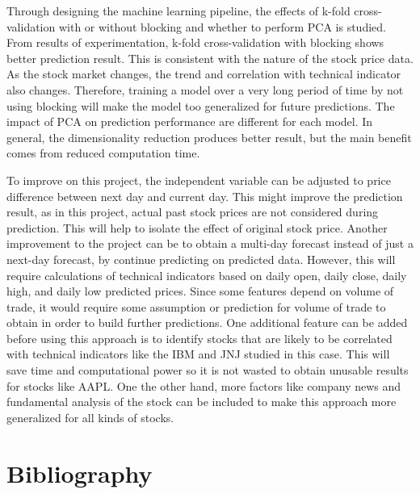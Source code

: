 \documentclass[conference]{IEEEtran}
\begin{document}
Through designing the machine learning pipeline, the effects of k-fold cross-validation with or without blocking and whether to perform PCA is studied. From results of experimentation, k-fold cross-validation with blocking shows better prediction result. This is consistent with the nature of the stock price data. As the stock market changes, the trend and correlation with technical indicator also changes. Therefore, training a model over a very long period of time by not using blocking will make the model too generalized for future predictions. The impact of PCA on prediction performance are different for each model. In general, the dimensionality reduction produces better result, but the main benefit comes from reduced computation time.

To improve on this project, the independent variable can be adjusted to price difference between next day and current day. This might improve the prediction result, as in this project, actual past stock prices are not considered during prediction. This will help to isolate the effect of original stock price. Another improvement to the project can be to obtain a multi-day forecast instead of just a next-day forecast, by continue predicting on predicted data. However, this will require calculations of technical indicators based on daily open, daily close, daily high, and daily low predicted prices. Since some features depend on volume of trade, it would require some assumption or prediction for volume of trade to obtain in order to build further predictions. One additional feature can be added before using this approach is to identify stocks that are likely to be correlated with technical indicators like the IBM and JNJ studied in this case. This will save time and computational power so it is not wasted to obtain unusable results for stocks like AAPL. One the other hand, more factors like company news and fundamental analysis of the stock can be included to make this approach more generalized for all kinds of stocks.


\section*{Bibliography}
\end{document}
